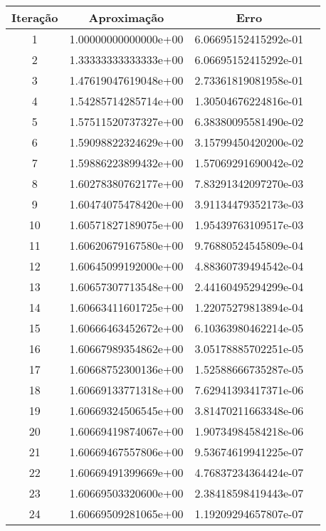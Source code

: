 \begin{table}[H]
\centering 
\begin{tabular}{|c|c|c|c|}
\hline 
Iteração & Aproximação & Erro \\ 
\hline 
1 & 1.00000000000000e+00 &  6.06695152415292e-01 \\ 
\hline
2 & 1.33333333333333e+00 &  6.06695152415292e-01 \\ 
\hline
3 & 1.47619047619048e+00 &  2.73361819081958e-01 \\ 
\hline
4 & 1.54285714285714e+00 &  1.30504676224816e-01 \\ 
\hline
5 & 1.57511520737327e+00 &  6.38380095581490e-02 \\ 
\hline
6 & 1.59098822324629e+00 &  3.15799450420200e-02 \\ 
\hline
7 & 1.59886223899432e+00 &  1.57069291690042e-02 \\ 
\hline
8 & 1.60278380762177e+00 &  7.83291342097270e-03 \\ 
\hline
9 & 1.60474075478420e+00 &  3.91134479352173e-03 \\ 
\hline
10 & 1.60571827189075e+00 &  1.95439763109517e-03 \\ 
\hline
11 & 1.60620679167580e+00 &  9.76880524545809e-04 \\ 
\hline
12 & 1.60645099192000e+00 &  4.88360739494542e-04 \\ 
\hline
13 & 1.60657307713548e+00 &  2.44160495294299e-04 \\ 
\hline
14 & 1.60663411601725e+00 &  1.22075279813894e-04 \\ 
\hline
15 & 1.60666463452672e+00 &  6.10363980462214e-05 \\ 
\hline
16 & 1.60667989354862e+00 &  3.05178885702251e-05 \\ 
\hline
17 & 1.60668752300136e+00 &  1.52588666735287e-05 \\ 
\hline
18 & 1.60669133771318e+00 &  7.62941393417371e-06 \\ 
\hline
19 & 1.60669324506545e+00 &  3.81470211663348e-06 \\ 
\hline
20 & 1.60669419874067e+00 &  1.90734984584218e-06 \\ 
\hline
21 & 1.60669467557806e+00 &  9.53674619941225e-07 \\ 
\hline
22 & 1.60669491399669e+00 &  4.76837234364424e-07 \\ 
\hline
23 & 1.60669503320600e+00 &  2.38418598419443e-07 \\ 
\hline
24 & 1.60669509281065e+00 &  1.19209294657807e-07 \\ 

\end{tabular}
\end{table}
